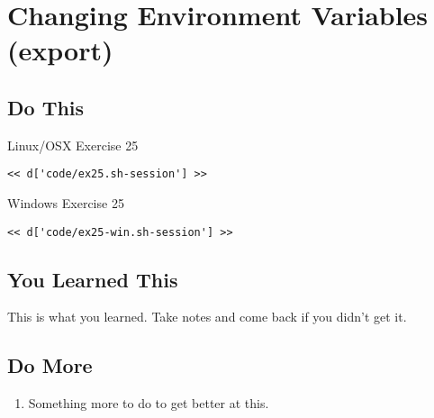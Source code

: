 \chapter{Changing Environment Variables (export)}

\section{Do This}

\begin{code}{Linux/OSX Exercise 25}
\begin{Verbatim}
<< d['code/ex25.sh-session'] >>
\end{Verbatim}
\end{code}

\begin{code}{Windows Exercise 25}
\begin{Verbatim}
<< d['code/ex25-win.sh-session'] >>
\end{Verbatim}
\end{code}

\section{You Learned This}

This is what you learned.  Take notes and come back if you didn't get it.

\section{Do More}

\begin{enumerate}
\item Something more to do to get better at this.
\end{enumerate}

